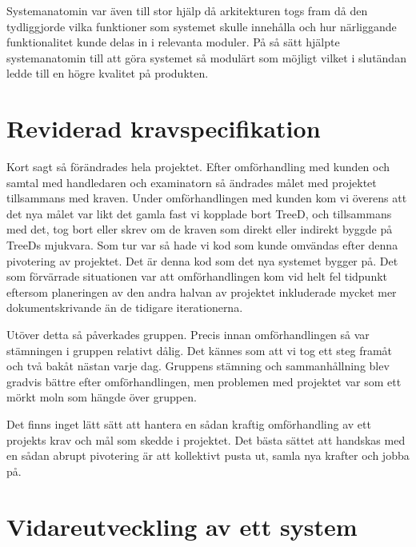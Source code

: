Systemanatomin var även till stor hjälp då arkitekturen togs fram då den tydliggjorde vilka funktioner som systemet skulle innehålla och hur närliggande funktionalitet kunde delas in i relevanta moduler. På så sätt hjälpte systemanatomin till att göra systemet så modulärt som möjligt vilket i slutändan ledde till en högre kvalitet på produkten.

\section{Reviderad kravspecifikation}
Kort sagt så förändrades hela projektet. Efter omförhandling med kunden och samtal med handledaren och examinatorn så ändrades målet med projektet tillsammans med kraven. Under omförhandlingen med kunden kom vi överens att det nya målet var likt det gamla fast vi kopplade bort TreeD, och tillsammans med det, tog bort eller skrev om de kraven som direkt eller indirekt byggde på TreeDs mjukvara. Som tur var så hade vi kod som kunde omvändas efter denna pivotering  
av projektet. Det är denna kod som det nya systemet bygger på. Det som förvärrade situationen var att omförhandlingen kom vid helt fel tidpunkt eftersom planeringen av den andra halvan av projektet inkluderade mycket mer dokumentskrivande än de tidigare iterationerna.

Utöver detta så påverkades gruppen. Precis innan omförhandlingen så var stämningen i gruppen relativt dålig. Det kännes som att vi tog ett steg framåt och två bakåt nästan varje dag. Gruppens stämning och sammanhållning blev gradvis bättre efter omförhandlingen, men problemen med projektet var som ett mörkt moln som hängde över gruppen.

Det finns inget lätt sätt att hantera en sådan kraftig omförhandling av ett projekts krav och mål som skedde i projektet. Det bästa sättet att handskas med en sådan abrupt pivotering är att kollektivt pusta ut, samla nya krafter och jobba på.  
\section{Vidareutveckling av ett system}



